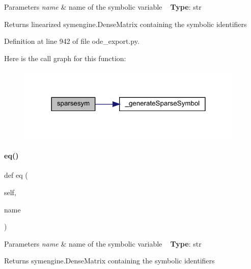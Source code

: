 \begin{DoxyParams}{Parameters}
{\em name} & name of the symbolic variable ~\newline
{\bfseries Type}\+: str\\
\hline
\end{DoxyParams}
\begin{DoxyReturn}{Returns}
linearized symengine.\+Dense\+Matrix containing the symbolic identifiers 
\end{DoxyReturn}


Definition at line 942 of file ode\+\_\+export.\+py.

Here is the call graph for this function\+:
\nopagebreak
\begin{figure}[H]
\begin{center}
\leavevmode
\includegraphics[width=306pt]{classamici_1_1ode__export_1_1_o_d_e_model_a0a1d830b8c4d1e208e81f48dfea71cf4_cgraph}
\end{center}
\end{figure}
\mbox{\label{classamici_1_1ode__export_1_1_o_d_e_model_addafc9d839b53dbe76461d8ac6dba604}} 
\paragraph{\texorpdfstring{eq()}{eq()}}
{\footnotesize\ttfamily def eq (\begin{DoxyParamCaption}\item[{}]{self,  }\item[{}]{name }\end{DoxyParamCaption})}


\begin{DoxyParams}{Parameters}
{\em name} & name of the symbolic variable ~\newline
{\bfseries Type}\+: str\\
\hline
\end{DoxyParams}
\begin{DoxyReturn}{Returns}
symengine.\+Dense\+Matrix containing the symbolic identifiers 
\end{DoxyReturn}


